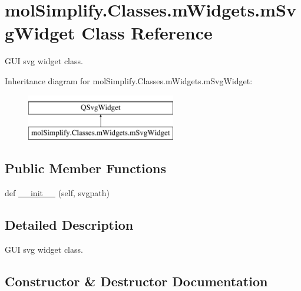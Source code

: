 \hypertarget{classmolSimplify_1_1Classes_1_1mWidgets_1_1mSvgWidget}{}\section{mol\+Simplify.\+Classes.\+m\+Widgets.\+m\+Svg\+Widget Class Reference}
\label{classmolSimplify_1_1Classes_1_1mWidgets_1_1mSvgWidget}


G\+UI svg widget class.  


Inheritance diagram for mol\+Simplify.\+Classes.\+m\+Widgets.\+m\+Svg\+Widget\+:\begin{figure}[H]
\begin{center}
\leavevmode
\includegraphics[height=2.000000cm]{classmolSimplify_1_1Classes_1_1mWidgets_1_1mSvgWidget}
\end{center}
\end{figure}
\subsection*{Public Member Functions}
\begin{DoxyCompactItemize}
\item 
def \hyperlink{classmolSimplify_1_1Classes_1_1mWidgets_1_1mSvgWidget_aa11201d67c84576d929ede296b2a447e}{\+\_\+\+\_\+init\+\_\+\+\_\+} (self, svgpath)
\end{DoxyCompactItemize}


\subsection{Detailed Description}
G\+UI svg widget class. 

\subsection{Constructor \& Destructor Documentation}
\mbox{\label{classmolSimplify_1_1Classes_1_1mWidgets_1_1mSvgWidget_aa11201d67c84576d929ede296b2a447e}} 

